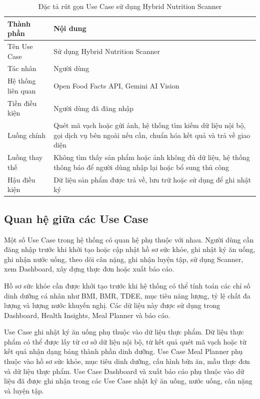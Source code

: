\documentclass[12pt, a4paper]{report}
\begin{document}
\begin{table}[htbp]
\centering
\caption{Đặc tả rút gọn Use Case sử dụng Hybrid Nutrition Scanner}
\begin{tabular}{|p{5cm}|p{10cm}|}
\hline
\textbf{Thành phần} & \textbf{Nội dung} \\
\hline
Tên Use Case & Sử dụng Hybrid Nutrition Scanner \\
\hline
Tác nhân & Người dùng \\
\hline
Hệ thống liên quan & Open Food Facts API, Gemini AI Vision \\
\hline
Tiền điều kiện & Người dùng đã đăng nhập \\
\hline
Luồng chính & Quét mã vạch hoặc gửi ảnh, hệ thống tìm kiếm dữ liệu nội bộ, gọi dịch vụ bên ngoài nếu cần, chuẩn hóa kết quả và trả về giao diện \\
\hline
Luồng thay thế & Không tìm thấy sản phẩm hoặc ảnh không đủ dữ liệu, hệ thống thông báo để người dùng nhập lại hoặc bổ sung thủ công \\
\hline
Hậu điều kiện & Dữ liệu sản phẩm được trả về, lưu trữ hoặc sử dụng để ghi nhật ký \\
\hline
\end{tabular}
\end{table}
\subsection{Quan hệ giữa các Use Case}Một số Use Case trong hệ thống có quan hệ phụ thuộc với nhau. Người dùng cần đăng nhập trước khi khởi tạo hoặc cập nhật hồ sơ sức khỏe, ghi nhật ký ăn uống, ghi nhận nước uống, theo dõi cân nặng, ghi nhận luyện tập, sử dụng Scanner, xem Dashboard, xây dựng thực đơn hoặc xuất báo cáo.

Hồ sơ sức khỏe cần được khởi tạo trước khi hệ thống có thể tính toán các chỉ số dinh dưỡng cá nhân như BMI, BMR, TDEE, mục tiêu năng lượng, tỷ lệ chất đa lượng và lượng nước khuyến nghị. Các dữ liệu này được sử dụng trong Dashboard, Health Insights, Meal Planner và báo cáo.

Use Case ghi nhật ký ăn uống phụ thuộc vào dữ liệu thực phẩm. Dữ liệu thực phẩm có thể được lấy từ cơ sở dữ liệu nội bộ, từ kết quả quét mã vạch hoặc từ kết quả nhận dạng bảng thành phần dinh dưỡng. Use Case Meal Planner phụ thuộc vào hồ sơ sức khỏe, mục tiêu dinh dưỡng, cấu hình bữa ăn, mẫu thực đơn và dữ liệu thực phẩm. Use Case Dashboard và xuất báo cáo phụ thuộc vào dữ liệu đã được ghi nhận trong các Use Case nhật ký ăn uống, nước uống, cân nặng và luyện tập.
\end{document}
